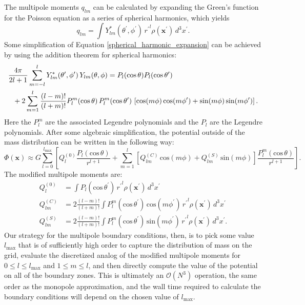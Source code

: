 \begin{itemize}
The multipole moments $q_{lm}$ can be calculated by expanding the Green's function for the Poisson equation as a series of spherical harmonics, which yields
\begin{equation}
  q_{lm} = \int Y^*_{lm}(\theta^\prime, \phi^\prime)\, {r^\prime}^l \rho(\mathbf{x}^\prime)\, d^3x^\prime. \label{multipole_moments_original}
\end{equation}
Some simplification of Equation \ref{spherical_harmonic_expansion} can be achieved by using the addition theorem for spherical harmonics:
\begin{align}
  &\frac{4\pi}{2l+1} \sum_{m=-l}^{l} Y^*_{lm}(\theta^\prime,\phi^\prime)\, Y_{lm}(\theta, \phi) = P_l(\text{cos}\, \theta) P_l(\text{cos}\, \theta^\prime) \notag \\
  &\ \ + 2 \sum_{m=1}^{l} \frac{(l-m)!}{(l+m)!} P_{l}^{m}(\text{cos}\, \theta)\, P_{l}^{m}(\text{cos}\, \theta^\prime)\, \left[\text{cos}(m\phi)\, \text{cos}(m\phi^\prime) + \text{sin}(m\phi)\, \text{sin}(m\phi^\prime)\right].
\end{align}
Here the $P_{l}^{m}$ are the associated Legendre polynomials and the $P_l$ are the Legendre polynomials. After some algebraic simplification, the potential outside of the mass distribution can be written in the following way:
\begin{equation}
  \Phi(\mathbf{x}) \approx G\sum_{l=0}^{l_{\text{max}}} \left[Q_l^{(0)} \frac{P_l(\text{cos}\, \theta)}{r^{l+1}} + \sum_{m = 1}^{l}\left[ Q_{lm}^{(C)}\, \text{cos}(m\phi) + Q_{lm}^{(S)}\, \text{sin}(m\phi)\right] \frac{P_{l}^{m}(\text{cos}\, \theta)}{r^{l+1}} \right].
\end{equation}
The modified multipole moments are:
\begin{align}
  Q_l^{(0)}   &= \int P_l(\text{cos}\, \theta^\prime)\, {r^{\prime}}^l \rho(\mathbf{x}^\prime)\, d^3 x^\prime \\
  Q_{lm}^{(C)} &= 2\frac{(l-m)!}{(l+m)!} \int P_{l}^{m}(\text{cos}\, \theta^\prime)\, \text{cos}(m\phi^\prime)\, {r^\prime}^l \rho(\mathbf{x}^\prime)\, d^3 x^\prime \\
  Q_{lm}^{(S)} &= 2\frac{(l-m)!}{(l+m)!} \int P_{l}^{m}(\text{cos}\, \theta^\prime)\, \text{sin}(m\phi^\prime)\, {r^\prime}^l \rho(\mathbf{x}^\prime)\, d^3 x^\prime.
\end{align}
Our strategy for the multipole boundary conditions, then, is to pick some value $l_{\text{max}}$ that is of sufficiently high order to capture the distribution of mass on the grid, evaluate the discretized analog of the modified multipole moments for $0 \leq l \leq l_{\text{max}}$ and $1 \leq m \leq l$, and then directly compute the value of the potential on all of the boundary zones. This is ultimately an $\mathcal{O}(N^3)$ operation, the same order as the monopole approximation, and the wall time required to calculate the boundary conditions will depend on the chosen value of $l_{\text{max}}$.


\end{itemize}
